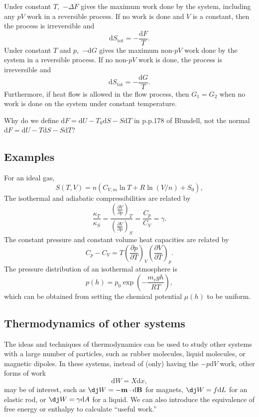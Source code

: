 \documentclass{article}
\theoremstyle{nonumberplain}
\begin{document}
Under constant $T,$ $-\Delta F$ gives the maximum work done by the system, including any $pV$ work in a reversible process. If no work is done and $V$ is a constant, then the process is irreversible and 
\[
    \mathrm{d} S_{\mathrm{tot} } = -\frac{\mathrm{d} F}{T}.
\]
Under constant $T$ and $p,$ $-\mathrm{d} G$ gives the maximum non-$pV$ work done by the system in a reversible process. If no non-$pV$ work is done, the process is irreversible and 
\[
    \mathrm{d} S_{\mathrm{tot} } = -\frac{\mathrm{d} G}{T}.
\]
Furthermore, if heat flow is allowed in the flow process, then $G_1 = G_2$ when no work is done on the system under constant temperature. 

Why do we define $\mathrm{d} F = \mathrm{d} U - T_0 \mathrm{d} S - S \mathrm{d} T$ in p.p.178 of Blundell, not the normal $\mathrm{d} F = \mathrm{d} U - T \mathrm{d} S - S \mathrm{d} T$? 

\subsection{Examples}
For an ideal gas,
\[
    S(T,V) = n (C_{V,m } \ln T + R \ln (V/n) + S_0), 
\]
The isothermal and adiabatic compressibilities are related by 
\[
    \frac{\kappa _{T} }{\kappa _{S} } = 
    \frac{\left( \frac{\partial V}{\partial p} \right)_{T} }{\left( \frac{\partial V}{\partial p} \right)_{S} }
    =\frac{C_p}{C_V} = \gamma.
\]
The constant pressure and constant volume heat capacities are related by
\[
    C_p - C_V = T \left( \frac{\partial p}{\partial T} \right)_{V} \left( \frac{\partial V}{\partial T} \right)_{p}.
\]
The pressure distribution of an isothermal atmosphere is 
\[
    p(h) = p_0 \exp \left(-\frac{m_r g h}{RT}\right),
\]
which can be obtained from setting the chemical potential $\mu(h)$ to be uniform.
\subsection{Thermodynamics of other systems}
The ideas and techniques of thermodynamics can be used to study other systems with a large number of particles, such as rubber molecules, liquid molecules, or magnetic dipoles. In these systems, instead of (only) having the $-p \mathrm{d} V$ work, other forms of work 
\[
    \mathrm{d} W = X \mathrm{d} x,
\]
may be of interest, such as $\mathrm{\dj} W = - \mathbf{m} \cdot \mathrm{d} \mathbf{B}$ for magnets, $\mathrm{\dj} W = f \mathrm{d} L$ for an elastic rod, or $\mathrm{\dj} W = \gamma \mathrm{d} A$ for a liquid.  
We can also introduce the equivalence of free energy or enthalpy to calculate ``useful work.''
\end{document}
